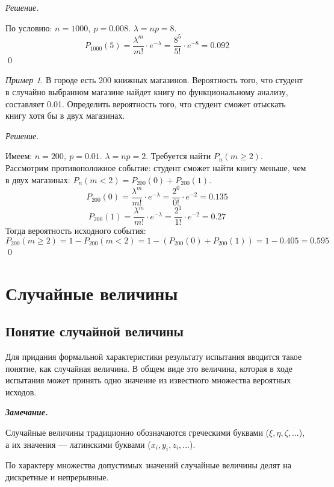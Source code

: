 \documentclass[12pt,a4paper]{article}
\theoremstyle{definition}
\theoremstyle{definition}
\theoremstyle{remark}
\newenvironment{remark}{
  \par\noindent\textbf{\textit{Замечание.}}~
}{\par}
\theoremstyle{corollary}
\newcommand{\nextblock}{\vspace{1.5em}\noindent}
\theoremstyle{bolditalic}
\newtheorem{example}{Пример}[section]
\newenvironment{solution}{
    \vspace{0.5em}
    \noindent\textit{Решение.}
}{\qed\vspace{1em}}
\begin{document}
\begin{solution}
    По условию: $n=1000,\ p=0.008$. $\lambda=np=8$.
    \[
    P_{1000}(5)=\frac{\lambda^m}{m!}\cdot e^{-\lambda}=\frac{8^5}{5!}\cdot e^{-8}=0.092
    \]
\end{solution}

\begin{example}
    В городе есть 200 книжных магазинов. Вероятность того, что студент в случайно выбранном магазине найдет книгу по функциональному анализу, составляет 0.01. Определить вероятность того, что студент сможет отыскать книгу хотя бы в двух магазинах.
\end{example}

\begin{solution}
    Имеем: $n=200,\ p=0.01$. $\lambda=np=2$. Требуется найти $P_n(m\ge2)$.
    Рассмотрим противоположное событие: студент сможет найти книгу меньше, чем в двух магазинах: $P_n(m < 2)=P_{200}(0)+P_{200}(1)$.
    \[
    P_{200}(0)=\frac{\lambda^m}{m!}\cdot e^{-\lambda}=\frac{2^0}{0!}\cdot e^{-2}=0.135
    \]
    \[
    P_{200}(1)=\frac{\lambda^m}{m!}\cdot e^{-\lambda}=\frac{2^1}{1!}\cdot e^{-2}=0.27
    \]
    Тогда вероятность исходного события:
    \[
    P_{200}(m\ge2)=1-P_{200}(m<2)=1-(P_{200}(0)+P_{200}(1))=1-0.405=0.595
    \]
\end{solution}

\newpage

\section{Случайные величины}

\subsection{Понятие случайной величины}

Для придания формальной характеристики результату испытания вводится такое понятие, как случайная величина. В общем виде это величина, которая в ходе испытания может принять одно значение из известного множества вероятных исходов.

\begin{remark}
    Случайные величины традиционно обозначаются греческими буквами ($\xi, \eta, \zeta, ... $), а их значения --- латинскими буквами ($x_i, y_i, z_i, ...$).
\end{remark}

\nextblock

По характеру множества допустимых значений случайные величины делят на дискретные и непрерывные.
\end{document}
